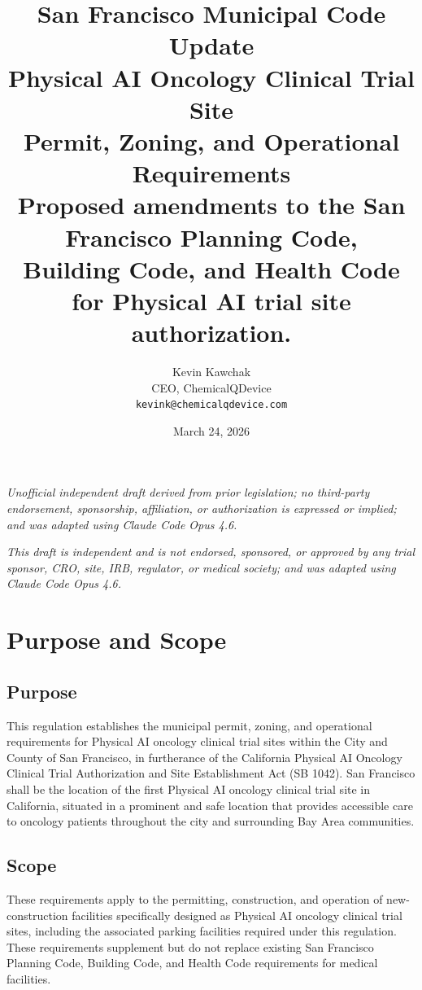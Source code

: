 \documentclass[11pt,letterpaper]{article}
\title{%
  \textbf{San Francisco Municipal Code Update}\\[6pt]
  \large Physical AI Oncology Clinical Trial Site\\
  Permit, Zoning, and Operational Requirements\\[6pt]
  \normalsize Proposed amendments to the San Francisco Planning Code,\\
  Building Code, and Health Code for Physical AI trial site authorization.
}
\author{%
  Kevin Kawchak\\
  CEO, ChemicalQDevice\\
  \texttt{kevink@chemicalqdevice.com}
}
\date{March 24, 2026}
\begin{document}
\maketitle
\thispagestyle{fancy}

\begin{center}
\footnotesize
\textit{Unofficial independent draft derived from prior legislation;
no third-party endorsement, sponsorship, affiliation, or authorization
is expressed or implied; and was adapted using Claude Code Opus 4.6.}
\end{center}

\vspace{0.5em}

\begin{center}
\footnotesize
\textit{This draft is independent and is not endorsed, sponsored, or approved
by any trial sponsor, CRO, site, IRB, regulator, or medical society;
and was adapted using Claude Code Opus 4.6.}
\end{center}

\vspace{1em}
\tableofcontents
\newpage

\section{Purpose and Scope}

\subsection{Purpose}

This regulation establishes the municipal permit, zoning, and operational
requirements for Physical AI oncology clinical trial sites within the City and
County of San Francisco, in furtherance of the California Physical AI Oncology
Clinical Trial Authorization and Site Establishment Act (SB 1042). San
Francisco shall be the location of the first Physical AI oncology clinical trial
site in California, situated in a prominent and safe location that provides
accessible care to oncology patients throughout the city and surrounding Bay
Area communities.

\subsection{Scope}

These requirements apply to the permitting, construction, and operation of
new-construction facilities specifically designed as Physical AI oncology
clinical trial sites, including the associated parking facilities required under
this regulation. These requirements supplement but do not replace existing San
Francisco Planning Code, Building Code, and Health Code requirements for medical
facilities.
\end{document}

